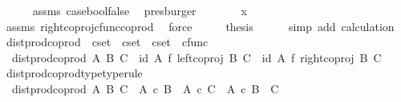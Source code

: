 \begin{isabellebody}
\ \ \ \ \isamarkupfalse%
\ assms\ case{\isacharunderscore}{\kern0pt}bool{\isacharunderscore}{\kern0pt}false\ \isamarkupfalse%
\ presburger\isanewline
\ \ \isamarkupfalse%
\ \isamarkupfalse%
\ {\isachardoublequoteopen}{\isachardot}{\kern0pt}{\isachardot}{\kern0pt}{\isachardot}{\kern0pt}\ {\isacharequal}{\kern0pt}\ x{}{\isachardoublequoteclose}\isanewline
\ \ \ \ \isamarkupfalse%
\ assms\ right{\isacharunderscore}{\kern0pt}coproj{\isacharunderscore}{\kern0pt}cfunc{\isacharunderscore}{\kern0pt}coprod\ \isamarkupfalse%
\ force\isanewline
\ \ \isamarkupfalse%
\ \isamarkupfalse%
\ {\isacharquery}{\kern0pt}thesis\isanewline
\ \ \ \ \isamarkupfalse%
\ {\isacharparenleft}{\kern0pt}simp\ add{\isacharcolon}{\kern0pt}\ calculation{\isacharparenright}{\kern0pt}\isanewline
{}\isamarkupfalse%
%
\endisatagproof
{\isafoldproof}%
%
\isadelimproof
%
\endisadelimproof
%
\isadelimdocument
%
\endisadelimdocument
%
\isatagdocument
%
\isamarkuptrue%
%
\isamarkuptrue%
%
\endisatagdocument
{\isafolddocument}%
%
\isadelimdocument
%
\endisadelimdocument
{}\isamarkupfalse%
\ dist{\isacharunderscore}{\kern0pt}prod{\isacharunderscore}{\kern0pt}coprod\ {\isacharcolon}{\kern0pt}{\isacharcolon}{\kern0pt}\ {\isachardoublequoteopen}cset\ {\isasymRightarrow}\ cset\ {\isasymRightarrow}\ cset\ {\isasymRightarrow}\ cfunc{\isachardoublequoteclose}\ \isanewline
\ \ {\isachardoublequoteopen}dist{\isacharunderscore}{\kern0pt}prod{\isacharunderscore}{\kern0pt}coprod\ A\ B\ C\ {\isacharequal}{\kern0pt}\ {\isacharparenleft}{\kern0pt}id\ A\ {\isasymtimes}\isactrlsub f\ left{\isacharunderscore}{\kern0pt}coproj\ B\ C{\isacharparenright}{\kern0pt}\ {\isasymamalg}\ {\isacharparenleft}{\kern0pt}id\ A\ {\isasymtimes}\isactrlsub f\ right{\isacharunderscore}{\kern0pt}coproj\ B\ C{\isacharparenright}{\kern0pt}{\isachardoublequoteclose}\isanewline
\isanewline
{}\isamarkupfalse%
\ dist{\isacharunderscore}{\kern0pt}prod{\isacharunderscore}{\kern0pt}coprod{\isacharunderscore}{\kern0pt}type{\isacharbrackleft}{\kern0pt}type{\isacharunderscore}{\kern0pt}rule{\isacharbrackright}{\kern0pt}{\isacharcolon}{\kern0pt}\isanewline
\ \ {\isachardoublequoteopen}dist{\isacharunderscore}{\kern0pt}prod{\isacharunderscore}{\kern0pt}coprod\ A\ B\ C\ {\isacharcolon}{\kern0pt}\ {\isacharparenleft}{\kern0pt}A\ {\isasymtimes}\isactrlsub c\ B{\isacharparenright}{\kern0pt}\ {\isasymCoprod}\ {\isacharparenleft}{\kern0pt}A\ {\isasymtimes}\isactrlsub c\ C{\isacharparenright}{\kern0pt}\ {\isasymrightarrow}\ A\ {\isasymtimes}\isactrlsub c\ {\isacharparenleft}{\kern0pt}B\ {\isasymCoprod}\ C{\isacharparenright}{\kern0pt}{\isachardoublequoteclose}\isanewline

\end{isabellebody}
